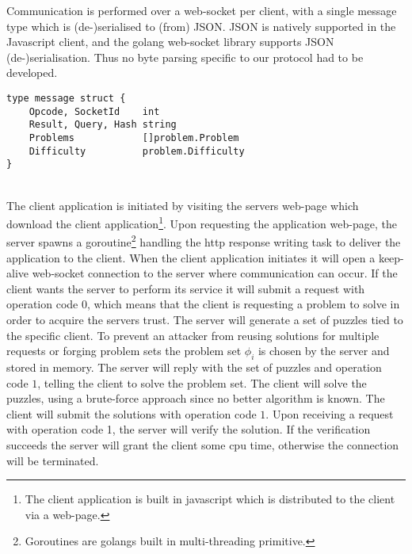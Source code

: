 Communication is performed over a web-socket per client, with a single message type which is (de-)serialised to (from) JSON. JSON is natively supported in the Javascript client, and the golang web-socket library supports JSON (de-)serialisation. Thus no byte parsing specific to our protocol had to be developed.
\begin{verbatim}
type message struct {
	Opcode, SocketId    int
	Result, Query, Hash string
	Problems            []problem.Problem
	Difficulty          problem.Difficulty
}
\end{verbatim}
\\
The client application is initiated by visiting the servers web-page which download the client application\footnote{The client application is built in javascript which is distributed to the client via a web-page.}. Upon requesting the application web-page, the server spawns a goroutine\footnote{Goroutines are golangs built in multi-threading primitive.} handling the http response writing task to deliver the application to the client.
When the client application initiates it will open a keep-alive web-socket connection to the server where communication can occur. 
If the client wants the server to perform its service it will submit a request with operation code $0$, which means that the client is requesting a problem to solve in order to acquire the servers trust. The server will generate a set of puzzles tied to the specific client. To prevent an attacker from reusing solutions for multiple requests or forging problem sets the problem set $\phi_i$ is chosen by the server and stored in memory. The server will reply with the set of puzzles and operation code $1$, telling the client to solve the problem set. The client will solve the puzzles, using a brute-force approach since no better algorithm is known. The client will submit the solutions with operation code $1$. Upon receiving a request with operation code 1, the server will verify the solution. If the verification succeeds the server will grant the client some cpu time, otherwise the connection will be terminated.






